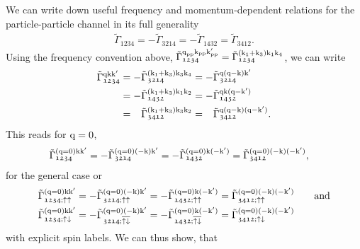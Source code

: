 \documentclass[main.tex]{subfiles}
\begin{document}
We can write down useful frequency and momentum-dependent relations for the particle-particle channel in its full generality \cite{rohringer thesis}
\begin{align}
	\tilde{\Gamma}_{\mathfrak{1234}}=-\tilde{\Gamma}_{\mathfrak{3214}}=-\tilde{\Gamma}_{\mathfrak{1432}}=\tilde{\Gamma}_{\mathfrak{3412}}.
\end{align}
Using the frequency convention above, $\tilde{\Gamma}^{\text{q}_{\text{pp}}\text{k}_{\text{pp}}\text{k}'_{\text{pp}}}_{\mathfrak{1234}}=\tilde{\Gamma}^{(\text{k}_1+\text{k}_3)\text{k}_1\text{k}_4}_{\mathfrak{1234}}$, we can write
\begin{subequations}
\begin{align}
	\tilde{\Gamma}_{\mathfrak{1234}}^{\text{q}\text{k}\text{k}'}&=-\tilde{\Gamma}_{\mathfrak{3214}}^{(\text{k}_1+\text{k}_3)\text{k}_3\text{k}_4}=-\tilde{\Gamma}_{\mathfrak{3214}}^{\text{q}(\text{q}-\text{k})\text{k}'}\\
	&=-\tilde{\Gamma}_{\mathfrak{1432}}^{(\text{k}_1+\text{k}_3)\text{k}_1\text{k}_2}=-\tilde{\Gamma}_{\mathfrak{1432}}^{\text{q}\text{k}(\text{q}-\text{k}')}\\
	&=\phantom{-}\tilde{\Gamma}_{\mathfrak{3412}}^{(\text{k}_1+\text{k}_3)\text{k}_3\text{k}_2}=\phantom{-}\tilde{\Gamma}_{\mathfrak{3412}}^{\text{q}(\text{q}-\text{k})(\text{q}-\text{k}')}.
\end{align}
\end{subequations}
This reads for $\text{q}=0$,
\begin{align}
	\tilde{\Gamma}_{\mathfrak{1234}}^{(\text{q}=0)\text{k}\text{k}'}&=-\tilde{\Gamma}_{\mathfrak{3214}}^{(\text{q}=0)(-\text{k})\text{k}'}=-\tilde{\Gamma}_{\mathfrak{1432}}^{(\text{q}=0)\text{k}(-\text{k}')}=\tilde{\Gamma}_{\mathfrak{3412}}^{(\text{q}=0)(-\text{k})(-\text{k}')},
\end{align}
for the general case or
\begin{subequations}\label{eq:frequency_relations_vertex_pp_spins}
\begin{align}
	\tilde{\Gamma}_{\mathfrak{1234};\uparrow\uparrow}^{(\text{q}=0)\text{k}\text{k}'}&=-\tilde{\Gamma}_{\mathfrak{3214};\uparrow\uparrow}^{(\text{q}=0)(-\text{k})\text{k}'}=-\tilde{\Gamma}_{\mathfrak{1432};\uparrow\uparrow}^{(\text{q}=0)\text{k}(-\text{k}')}=\tilde{\Gamma}_{\mathfrak{3412};\uparrow\uparrow}^{(\text{q}=0)(-\text{k})(-\text{k}')}\qquad\text{and}\\
	\tilde{\Gamma}_{\mathfrak{1234};\uparrow\downarrow}^{(\text{q}=0)\text{k}\text{k}'}&=-\tilde{\Gamma}_{\mathfrak{3214};\overline{\uparrow\downarrow}}^{(\text{q}=0)(-\text{k})\text{k}'}=-\tilde{\Gamma}_{\mathfrak{1432};\overline{\uparrow\downarrow}}^{(\text{q}=0)\text{k}(-\text{k}')}=\tilde{\Gamma}_{\mathfrak{3412};\uparrow\downarrow}^{(\text{q}=0)(-\text{k})(-\text{k}')}
\end{align}
\end{subequations}
with explicit spin labels. We can thus show, that
\end{document}
